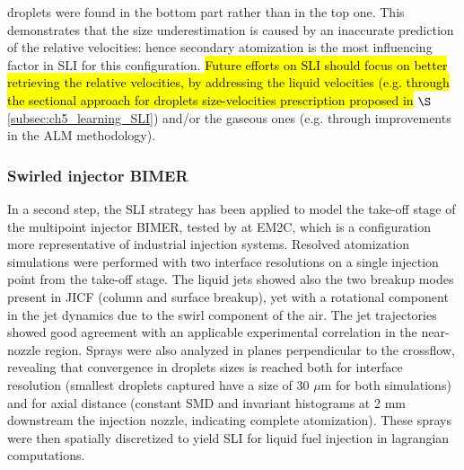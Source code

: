 droplets were found in the bottom part rather than in the top one. This demonstrates that the size underestimation is caused by an inaccurate prediction of the relative velocities: hence secondary atomization is the most influencing factor in SLI for this configuration. \hl{Future efforts on SLI should focus on better retrieving the relative velocities, by addressing the liquid velocities (e.g. through the sectional approach for droplets size-velocities prescription proposed in} $\S$\ref{subsec:ch5_learning_SLI}) and/or the gaseous ones (e.g. through improvements in the ALM methodology).


\subsubsection*{Swirled injector BIMER}

In a second step, the SLI strategy has been applied to model the take-off stage of the multipoint injector BIMER, tested by  at EM2C, which is a configuration more representative of industrial injection systems. Resolved atomization simulations were performed with two interface resolutions on a single injection point from the take-off stage. The liquid jets showed also the two breakup modes present in JICF (column and surface breakup), yet with a rotational component in the jet dynamics due to the swirl component of the air. The jet trajectories showed good agreement with an applicable experimental correlation in the near-nozzle region. Sprays were also analyzed in planes perpendicular to the crossflow, revealing that convergence in droplets sizes is reached both for interface resolution (smallest droplets captured have a size of 30 $\mu$m for both simulations) and for axial distance (constant SMD and invariant histograms at 2 mm downstream the injection nozzle, indicating complete atomization). These sprays were then spatially discretized to yield SLI for liquid fuel injection in lagrangian computations. 

